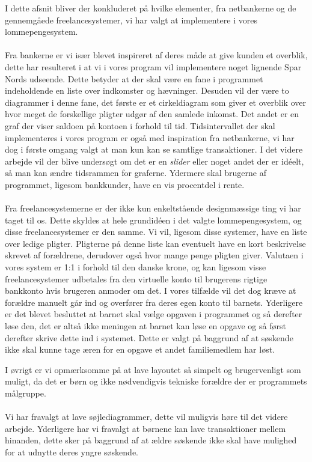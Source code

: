 I dette afsnit bliver der konkluderet på hvilke elementer, fra netbankerne og de gennemgåede freelancesystemer, vi har valgt at implementere i vores lommepengesystem.\\
\\
Fra bankerne er vi især blevet inspireret af deres måde at give kunden et overblik, dette har resulteret i at vi i vores program vil implementere noget lignende Spar Nords udseende. Dette betyder at der skal være en fane i programmet indeholdende en liste over indkomster og hævninger. Desuden vil der være to diagrammer i denne fane, det første er et cirkeldiagram som giver et overblik over hvor meget de forskellige pligter udgør af den samlede inkomst. Det andet er en graf der viser saldoen på kontoen i forhold til tid. Tidsintervallet der skal implementeres i vores program er også med inspiration fra netbankerne, vi har dog i første omgang valgt at man kun kan se samtlige transaktioner. I det videre arbejde vil der blive undersøgt om det er en \textit{slider} eller noget andet der er idéelt, så man kan ændre tidsrammen for graferne. Ydermere skal brugerne af programmet, ligesom bankkunder, have en vis procentdel i rente.\\
\\
Fra freelancesystemerne er der ikke kun enkeltstående designmæssige ting vi har taget til os. Dette skyldes at hele grundidéen i det  valgte lommepengesystem, og disse freelancesystemer er den samme. Vi  vil, ligesom disse systemer, have en liste over ledige pligter. Pligterne på denne liste kan eventuelt have en kort beskrivelse skrevet af forældrene, derudover også hvor mange penge pligten giver. Valutaen i vores system er 1:1 i forhold til den danske krone, og kan ligesom visse freelancesystemer udbetales fra den virtuelle konto til brugerens rigtige bankkonto hvis brugeren anmoder om det. I vores tilfælde vil det dog kræve at forældre manuelt går ind og overfører fra deres egen konto til barnets. Yderligere er det blevet besluttet at barnet skal vælge opgaven i programmet og så derefter løse den, det er altså ikke meningen at barnet kan løse en opgave og så først derefter skrive dette ind i systemet. Dette er valgt på baggrund af at søskende ikke skal kunne tage æren for en opgave et andet familiemedlem har løst.

I øvrigt er vi opmærksomme på at lave layoutet så simpelt og brugervenligt som muligt, da det er børn og ikke nødvendigvis tekniske forældre der er programmets målgruppe. \\
\\
Vi har fravalgt at lave søjlediagrammer, dette vil muligvis høre til det videre arbejde. Yderligere har vi fravalgt at børnene kan lave transaktioner mellem hinanden, dette sker på baggrund af at ældre søskende ikke skal have mulighed for at udnytte deres yngre søskende.





